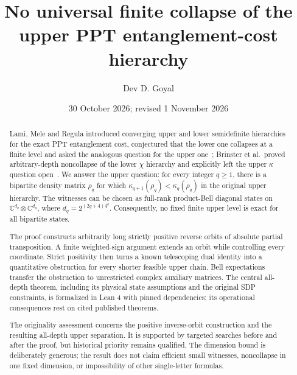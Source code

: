 \documentclass[11pt]{article}
\title{No universal finite collapse of the\\upper PPT entanglement-cost hierarchy}
\author{Dev D. Goyal}
\date{30 October 2026; revised 1 November 2026}
\newcommand{\C}{\mathbb C}
\begin{document}
\maketitle
\begin{abstract}
Lami, Mele and Regula introduced converging upper and lower semidefinite
hierarchies for the exact PPT entanglement cost, conjectured that the lower
one collapses at a finite level and asked the analogous question for the
upper one~\cite{LMR}; Brinster et al.\ proved arbitrary-depth
noncollapse of the lower $\chi$ hierarchy and explicitly left the upper
$\kappa$ question open~\cite{Brinster}. We answer the upper question: for
every integer $q\ge1$, there is a bipartite density matrix $\rho_q$ for which
$\kappa_{q+1}(\rho_q)<\kappa_q(\rho_q)$ in the original upper hierarchy. The
witnesses can be chosen as full-rank product-Bell diagonal states on
$\C^{d_q}\otimes\C^{d_q}$, where $d_q=2^{(2q+4)4^q}$. Consequently, no fixed
finite upper level is exact for all bipartite states.

The proof constructs arbitrarily long strictly positive reverse orbits of
absolute partial transposition. A finite weighted-sign argument extends an
orbit while controlling every coordinate. Strict positivity then turns a
known telescoping dual identity into a quantitative obstruction for every
shorter feasible upper chain. Bell expectations transfer the obstruction to
unrestricted complex auxiliary matrices. The central all-depth theorem,
including its physical state assumptions and the original SDP constraints,
is formalized in Lean 4 with pinned dependencies; its operational
consequences rest on cited published theorems.

The originality assessment concerns the positive inverse-orbit construction
and the resulting all-depth upper separation. It is supported by targeted
searches before and after the proof, but historical priority remains
qualified. The dimension bound is deliberately generous; the result does not
claim efficient small witnesses, noncollapse in one fixed dimension, or
impossibility of other single-letter formulas.
\end{abstract}

\clearpage
\tableofcontents
\newpage
\end{document}
